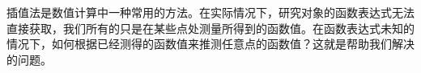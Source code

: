 
插值法是数值计算中一种常用的方法。在实际情况下，研究对象的函数表达式无法直接获取，我们所有的只是在某些点处测量所得到的函数值。在函数表达式未知的情况下，如何根据已经测得的函数值来推测任意点的函数值？这就是帮助我们解决的问题。
